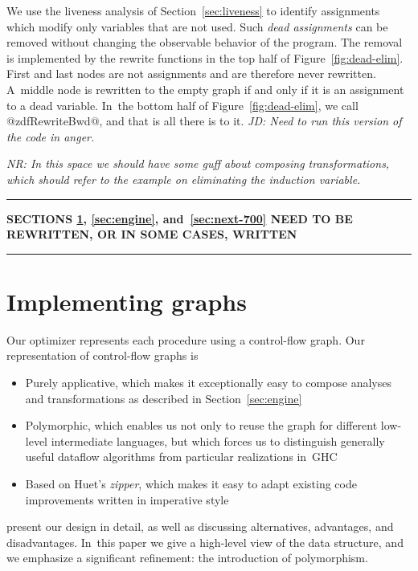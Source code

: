 \documentclass[blockstyle,preprint,nocopyrightspace]{sigplanconf}
\newcommand{\authornote}[1]{{\em #1}}
\newcommand{\norman}[1]{\authornote{NR: #1}}
\let\remark\norman
\newcommand{\john}[1]{\authornote{JD: #1}}
\newcommand\secref[1]{Section~\ref{sec:#1}}
\newcommand\seclabel[1]{\label{sec:#1}}
\newcommand\figref[1]{Figure~\ref{fig:#1}}
\begin{document}
\def\liveout{$\mathit{live_{out}}$}

We use the liveness analysis of \secref{liveness} to identify
assignments which modify only variables that are not used.
Such \emph{dead assignments} can be removed without changing the
observable behavior of the program.
The removal is implemented by the rewrite functions in the top half of
\figref{dead-elim}. 
First and last nodes are not assignments and are therefore never
rewritten.
A~middle node is rewritten to the empty graph if and only if it is an
assignment to a dead variable.
In~the bottom half of \figref{dead-elim}, we call @zdfRewriteBwd@, and
that is all there is to it.
\john{Need to run this version of the code in anger.}

\remark{In this space we should have some guff about
composing transformations, which should refer to the example on
eliminating the induction variable.}


\bigskip
\hrule
\smallskip

\textbf{SECTIONS \ref{sec:graphs}, \ref{sec:engine}, and~\ref{sec:next-700}
NEED TO BE REWRITTEN, OR IN SOME CASES, WRITTEN}

\smallskip

\hrule



\section{Implementing graphs}
\seclabel{graphs}

Our optimizer represents each procedure using a control-flow graph.
Our representation of control-flow graphs is
\begin{itemize}
\item
Purely applicative, which makes it exceptionally easy to compose
analyses and transformations as described in \secref{engine}
\item
Polymorphic, which enables us not only to reuse the graph for
different low-level intermediate languages, but which forces us to
distinguish generally useful dataflow algorithms from particular
realizations in~GHC
\item
Based on Huet's \citeyearpar{huet:zipper} \emph{zipper},
which makes it easy to adapt existing code improvements written in
imperative style
\end{itemize}
\citet{dias-ramsey:applicative-flow-graph} present our design in
detail, as well as discussing alternatives, advantages, and
disadvantages.
In~this paper we give a high-level view of the data structure, and we
emphasize a significant refinement: the introduction of polymorphism.
\end{document}
